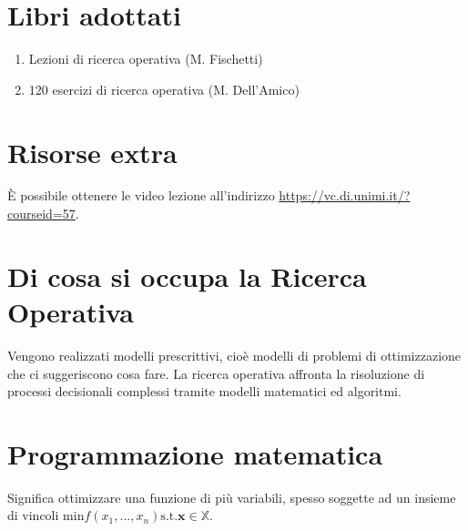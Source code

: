 \documentclass[\main/main.tex]{subfiles}
\begin{document}
\section{Libri adottati}
\begin{enumerate} 
\item Lezioni di ricerca operativa (M. Fischetti)
\item 120 esercizi di ricerca operativa (M. Dell'Amico)
\end{enumerate}

\section{Risorse extra}
È possibile ottenere le video lezione all'indirizzo \url{https://vc.di.unimi.it/?courseid=57}.

\section{Di cosa si occupa la Ricerca Operativa}
Vengono realizzati modelli prescrittivi, cioè modelli di problemi di ottimizzazione che ci suggeriscono cosa fare. La ricerca operativa affronta la risoluzione di processi decisionali complessi tramite modelli matematici ed algoritmi.

\section{Programmazione matematica}
Significa ottimizzare una funzione di più variabili, spesso soggette ad un insieme di vincoli $\text{min} f(x_1,..., x_n) \text{s.t.} \bm{x} \in \mathbb{X}$.
\end{document}
